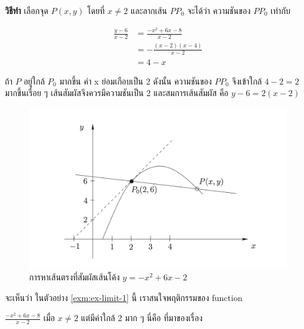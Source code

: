 \documentclass[
]{book}
\theoremstyle{definition}
\theoremstyle{definition}
\theoremstyle{definition}
\theoremstyle{definition}
\theoremstyle{remark}
\begin{document}
\textbf{วิธีทำ} เลือกจุด \(P(x,y)\) โดยที่ \(x \neq 2\) และลากเส้น \(PP_{0}\) จะได้ว่า
ความชันของ \(PP_{0}\) เท่ากับ

\begin{equation}
  \begin{aligned}
    \frac{y-6}{x-2} &= \frac{-x^{2}+6x-8}{x-2} \\
                    &=-\frac{\left( x-2\right) \left( x-4\right) }{x-2} \\
                    &=4-x
  \end{aligned}
\end{equation}

ถ้า \(P\) อยู่ใกล้ \(P_{0}\) มากขึ้น ค่า x ย่อมเกือบเป็น 2 ดังนั้น ความชันของ \(PP_{0}\)
จึงเข้าใกล้ \(4-2 = 2\) มากขึ้นเรื่อย ๆ เส้นสัมผัสจึงควรมีความชันเป็น 2 และสมการเส้นสัมผัส
คือ \(y-6=2\left( x-2\right)\)

\begin{figure}

{\centering \includegraphics[width=0.5\linewidth]{images/fig-tangent-line-2} 

}

\caption{การหาเส้นตรงที่สัมผัสเส้นโค้ง \(y=-x^{2}+6x-2\)}\label{fig:fig-tangent-line-2}
\end{figure}

จะเห็นว่า ในตัวอย่าง \ref{exm:ex-limit-1} นี้ เราสนใจพฤติกรรมของ function

\(\frac{-x^{2}+6x-8}{x-2}\) เมื่อ \(x \neq 2\) แต่มีค่าใกล้ 2 มาก ๆ นี่คือ ที่มาของเรื่อง
\end{document}
